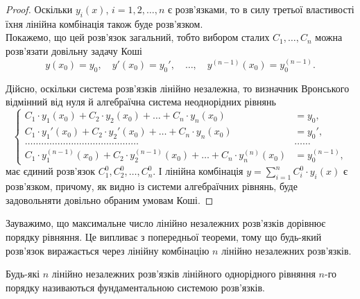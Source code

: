\begin{proof}
	Оскільки $y_i(x)$, $i = 1, 2, \ldots, n$ є розв’язками, то в силу третьої властивості їхня лінійна комбінація також буде розв’язком. \\

	Покажемо, що цей розв’язок загальний, тобто вибором сталих $C_1, \ldots, C_n$ можна розв’язати довільну задачу Коші
	\begin{equation}
		\label{eq:3.1.25}
		y(x_0) = y_0, \quad y'(x_0) = y_0', \quad \ldots, \quad y^{(n - 1)}(x_0) = y_0^{(n - 1)}.
	\end{equation}

	Дійсно, оскільки система розв’язків лінійно незалежна, то визначник Вронського відмінний від нуля й алгебраїчна система неоднорідних рівнянь
	\begin{equation}
		\label{eq:3.1.26}
		\left\{ \begin{aligned}
			C_1 \cdot y_1(x_0) + C_2 \cdot y_2(x_0) + \ldots + C_n \cdot y_n(x_0) &= y_0, \\
			C_1 \cdot y_1'(x_0) + C_2 \cdot y_2'(x_0) + \ldots + C_n \cdot y_n(x_0) &= y_0', \\
			\ldots \ldots \ldots \ldots \ldots \ldots \ldots \ldots \ldots \ldots \ldots \ldots \ldots \ldots & \ldots \ldots \\
			C_1 \cdot y_1^{(n - 1)}(x_0) + C_2 \cdot y_2^{(n - 1)}(x_0) + \ldots + C_n \cdot y_n^{(n)}(x_0) &= y_0^{(n - 1)},
		\end{aligned} \right.
	\end{equation}
	має єдиний розв’язок $C_1^0, C_2^0, \ldots, C_n^0$. І лінійна комбінація $y = \sum_{i = 1}^n C_i^0 \cdot y_i(x)$ є розв’язком, причому, як видно із системи алгебраїчних рівнянь, буде задовольняти довільно обраним умовам Коші.
\end{proof}

Зауважимо, що максимальне число лінійно незалежних розв’язків дорівнює порядку рівняння. Це випливає з попередньої теореми, тому що будь-який розв’язок виражається через лінійну комбінацію $n$ лінійно незалежних розв’язків.

\begin{definition}
	Будь-які $n$ лінійно незалежних розв’язків лінійного однорідного рівняння $n$-го порядку називаються фундаментальною системою розв’язків.
\end{definition}